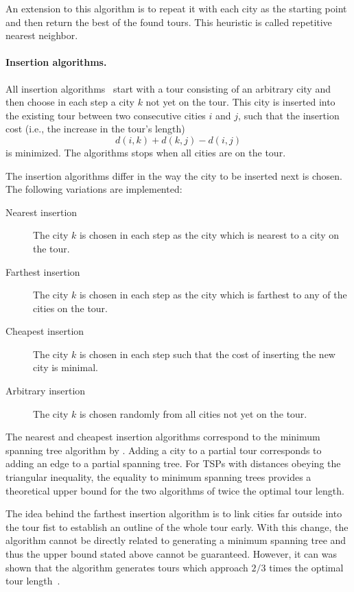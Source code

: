 \documentclass[10pt,a4paper,fleqn]{article}
\begin{document}
An extension to this algorithm is to repeat it with each city as
the starting point and then return the best of the found tours.
This heuristic is called repetitive nearest neighbor.

\paragraph{Insertion algorithms.}
All insertion algorithms~\citep{Rosenkrantz1977} start with
a tour consisting of an arbitrary city and then choose in each step a city $k$
not yet on the tour.  This city is inserted into the existing tour between two
consecutive cities $i$ and $j$, such that the insertion cost (i.e.,
the increase in the tour's length)
$$d(i,k) + d(k,j) - d(i,j)$$ 
is minimized.  The algorithms stops when all cities are on the tour.

The insertion algorithms differ in the way the city to be inserted next is
chosen. The following variations are implemented:

\begin{description}
\item[Nearest insertion] The city $k$ is chosen in each step as
the city which is nearest to a city on the tour.

\item[Farthest insertion] The city $k$ is chosen in each step as
the city which is farthest to any of the cities on the tour.

\item[Cheapest insertion] The city $k$ is chosen in each step 
such that the cost of inserting the new city is minimal.

\item[Arbitrary insertion] The city $k$ is chosen randomly from all cities
not yet on the tour.

\end{description}


The nearest and cheapest insertion algorithms correspond to the minimum
spanning tree algorithm by \cite{Prim1957}. Adding a city to a partial tour
corresponds to adding an edge to a partial spanning tree. For TSPs with
distances obeying the triangular inequality, the equality to minimum spanning
trees provides a theoretical upper bound for the two algorithms of twice the
optimal tour length.

The idea behind the farthest insertion algorithm is to link cities far outside
into the tour fist to establish an outline of the whole tour early. With this
change, the algorithm cannot be directly related to generating a minimum
spanning tree and thus the upper bound stated above cannot be guaranteed.
However, it can was shown that the algorithm generates tours which approach
$2/3$ times the optimal tour length~\citep{Johnson1985}. 
\end{document}

